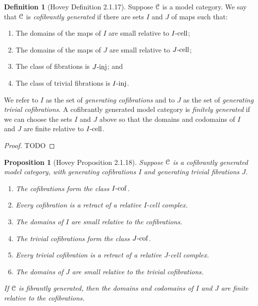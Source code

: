 \documentclass{amsart}
\theoremstyle{plain}
\newtheorem{proposition}[theorem]{Proposition}
\theoremstyle{definition}
\newtheorem{definition}[theorem]{Definition}
\newcommand{\0}{\mathbf{0}}
\newcommand{\cC}{\mathcal C}
\renewcommand{\(}{\left(}
\renewcommand{\)}{\right)}
\def\scr{\EuScript}
\def\cC{\scr{C}}
\newcommand{\inj}{\text-\mathrm{inj}}
\newcommand{\cell}{\text-\mathrm{cell}}
\newcommand{\cof}{\text-\mathrm{cof}}
\begin{document}
\begin{definition}[Hovey Definition 2.1.17]\label{2.1.17}
  Suppose $\cC$ is a model category. We say that $\cC$ is \textit{cofibrantly generated} if there are sets $I$ and $J$ of maps such that:\begin{enumerate}[label=\arabic*.,noitemsep,topsep=0pt]
    \item The domains of the maps of $I$ are small relative to $I\cell$;
    \item The domains of the maps of $J$ are small relative to $J\cell$;
    \item The class of fibrations is $J\inj$; and
    \item The class of trivial fibrations is $I\inj$.
  \end{enumerate}
  We refer to $I$ as the set of \textit{generating cofibrations} and to $J$ as the set of \textit{generating trivial cofibrations}. A cofibrantly generated model category is \textit{finitely generated} if we can choose the sets $I$ and $J$ above so that the domains and codomains of $I$ and $J$ are finite relative to $I\cell$.
\end{definition}
\begin{proof}
  TODO
\end{proof}

\begin{proposition}[Hovey Proposition 2.1.18]\label{2.1.18}
  Suppose $\cC$ is a cofibrantly generated model category, with generating cofibrations $I$ and generating trivial fibrations $J$.\begin{enumerate}[label=(\alph*),noitemsep,topsep=0pt]
    \item The cofibrations form the class $I\cof$.
    \item Every cofibration is a retract of a relative $I$-cell complex.
    \item The domains of $I$ are small relative to the cofibrations.
    \item The trivial cofibrations form the class $J\cof$.
    \item Every trivial cofibration is a retract of a relative $J$-cell complex.
    \item The domains of $J$ are small relative to the trivial cofibrations.
  \end{enumerate}
  If $\cC$ is fibrantly generated, then the domains and codomains of $I$ and $J$ are finite relative to the cofibrations.
\end{proposition}
\end{document}
